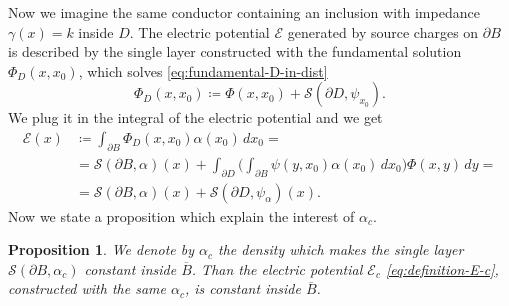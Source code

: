 \documentclass[10pt, a4paper, twoside, openright]{book}
\theoremstyle{definition}
\theoremstyle{plain}
\theoremstyle{plain}
\theoremstyle{plain}
\newtheorem{proposition}[subsection]{Proposition}
\theoremstyle{plain}
\theoremstyle{plain}
\theoremstyle{plain}
\theoremstyle{plain}
\theoremstyle{plain}
\begin{document}
\par
Now we imagine the same conductor containing an inclusion with impedance $\gamma(x)=k$ inside $D$. The electric potential $\mathcal{E}$ generated by source charges on $\partial B$ is described by the single layer constructed with the fundamental solution $\Phi_D(x,x_0)$, which solves \eqref{eq:fundamental-D-in-dist}
\begin{equation}
 \Phi_D(x,x_0)\coloneqq\Phi(x,x_0)+\mathcal{S}(\partial D,\psi_{x_0}).\label{eq:decomposition-Phi-D}
\end{equation}
We plug it in the integral of the electric potential and we get
\begin{align}
 \mathcal{E}(x)&\coloneqq\int_{\partial B}\Phi_D(x,x_0)\alpha(x_0)\,dx_0= \label{eq:definition-E-c}\\
  &=\mathcal{S}(\partial B, \alpha)(x) + \int_{\partial D} \Big(\int_{\partial B}\psi(y,x_0)\alpha(x_0)\,dx_0\Big)\Phi(x,y)\,dy = \\
  &=\mathcal{S}(\partial B, \alpha)(x) + \mathcal{S}(\partial D, \psi_{\alpha})(x). \label{eq:decomposition-E-c}
\end{align}
Now we state a proposition which explain the interest of $\alpha_{c}$.
\begin{proposition}
\label{prop:alpha_c-both-problems}
 We denote by $\alpha_{c}$ the density which makes the single layer $\mathcal{S}(\partial B, \alpha_{c})$ constant inside $\overline{B}$.
 Than the electric potential $\mathcal{E}_{c}$ \eqref{eq:definition-E-c}, constructed with the same $\alpha_{c}$, is constant inside $\overline{B}$.
\end{proposition}
\end{document}
